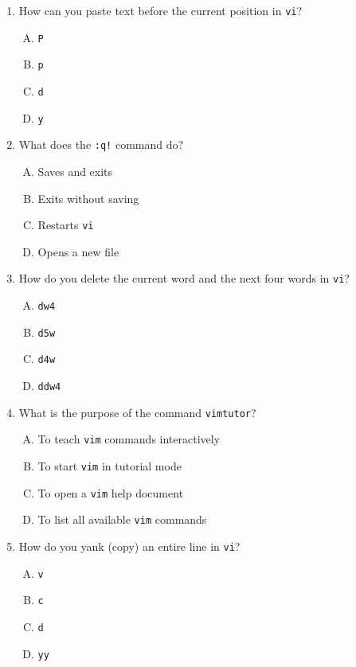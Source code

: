\documentclass[a4paper]{report}
\begin{document}
\begin{enumerate}[1.]
    \item How can you paste text before the current position in \texttt{vi}?  
    \begin{enumerate}[A)]
        \item \texttt{P}  
        \item \texttt{p}  
        \item \texttt{d}  
        \item \texttt{y}  
    \end{enumerate}

    \item What does the \texttt{:q!} command do?  
    \begin{enumerate}[A)]
        \item Saves and exits  
        \item Exits without saving  
        \item Restarts \texttt{vi}  
        \item Opens a new file  
    \end{enumerate}

    \item How do you delete the current word and the next four words in \texttt{vi}?  
    \begin{enumerate}[A)]
        \item \texttt{dw4}  
        \item \texttt{d5w}  
        \item \texttt{d4w}  
        \item \texttt{ddw4}  
    \end{enumerate}

    \item What is the purpose of the command \texttt{vimtutor}?  
    \begin{enumerate}[A)]
        \item To teach \texttt{vim} commands interactively  
        \item To start \texttt{vim} in tutorial mode  
        \item To open a \texttt{vim} help document  
        \item To list all available \texttt{vim} commands  
    \end{enumerate}

    \item How do you yank (copy) an entire line in \texttt{vi}?  
    \begin{enumerate}[A)]
        \item \texttt{v}  
        \item \texttt{c}  
        \item \texttt{d}  
        \item \texttt{yy}  
    \end{enumerate}


\end{enumerate}
\end{document}
